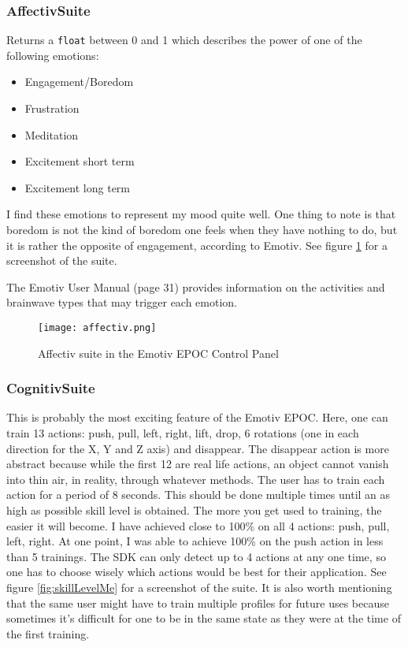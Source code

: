 \subsubsection{Affectiv\texttrademark  Suite}
\label{part:affectiv}
Returns a \texttt{float} between 0 and 1 which describes the power of one of the following emotions:
\begin{itemize}
	\item Engagement/Boredom
	\item Frustration
	\item Meditation
	\item Excitement short term
	\item Excitement long term
\end{itemize}

I find these emotions to represent my mood quite well. One thing to note is that boredom is not the kind of boredom one feels when they have nothing to do, but it is rather the opposite of engagement, according to Emotiv. See figure \ref{fig:affectiv} for a screenshot of the suite.

The Emotiv User Manual \cite{emotivUserManual} (page 31) provides information on the activities and brainwave types that may trigger each emotion.

\begin{figure}
  \centering
  \texttt{[image: affectiv.png]}
  \caption{Affectiv suite in the Emotiv EPOC Control Panel}
    \label{fig:affectiv}           
\end{figure}

\subsubsection{Cognitiv\texttrademark  Suite}
This is probably the most exciting feature of the Emotiv EPOC. Here, one can train 13 actions: push, pull, left, right, lift, drop, 6 rotations (one in each direction for the X, Y and Z axis) and disappear. The disappear action is more abstract because while the first 12 are real life actions, an object cannot vanish into thin air, in reality, through whatever methods. The user has to train each action for a period of 8 seconds. This should be done multiple times until an as high as possible skill level is obtained. The more you get used to training, the easier it will become. I have achieved close to 100\% on all 4 actions: push, pull, left, right. At one point, I was able to achieve 100\% on the push action in less than 5 trainings. The SDK can only detect up to 4 actions at any one time, so one has to choose wisely which actions would be best for their application. See figure \ref{fig:skillLevelMe} for a screenshot of the suite. It is also worth mentioning that the same user might have to train multiple profiles for future uses because sometimes it's difficult for one to be in the same state as they were at the time of the first training. 

